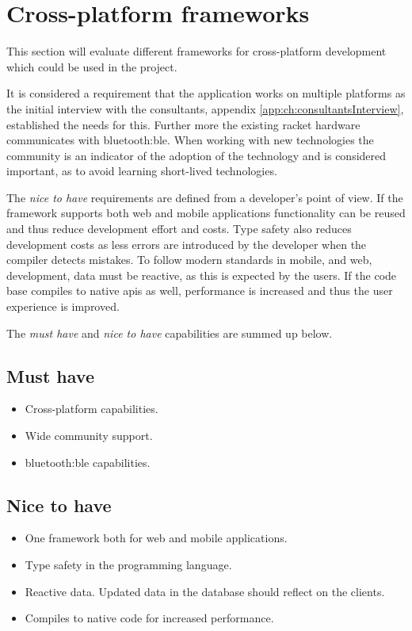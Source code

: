 \section{Cross-platform frameworks}
\label{sec:crossplatform}

This section will evaluate different frameworks for cross-platform development which could be used in the project.

It is considered a requirement that the application works on multiple platforms as the initial interview with the consultants, appendix \ref{app:ch:consultantsInterview}, established the needs for this. Further more the existing racket hardware communicates with \gls{bluetooth:ble}.
When working with new technologies the community is an indicator of the adoption of the technology and is considered important, as to avoid learning short-lived technologies.

The \textit{nice to have} requirements are defined from a developer's point of view.
If the framework supports both web and mobile applications functionality can be reused and thus reduce development effort and costs.
Type safety also reduces development costs as less errors are introduced by the developer when the compiler detects mistakes.
To follow modern standards in mobile, and web, development, data must be reactive, as this is expected by the users.
If the code base compiles to native \glspl{api} as well, performance is increased and thus the user experience is improved.

The \textit{must have} and \textit{nice to have} capabilities are summed up below.

\subsection*{Must have}
\begin{itemize}
	\item Cross-platform capabilities.
	\item Wide community support.
	\item \gls{bluetooth:ble} capabilities.
\end{itemize}

\subsection*{Nice to have}
\begin{itemize}
	\item One framework both for web and mobile applications.
	\item Type safety in the programming language.
	\item Reactive data. Updated data in the database should reflect on the clients.
	\item Compiles to native code for increased performance.
\end{itemize}

